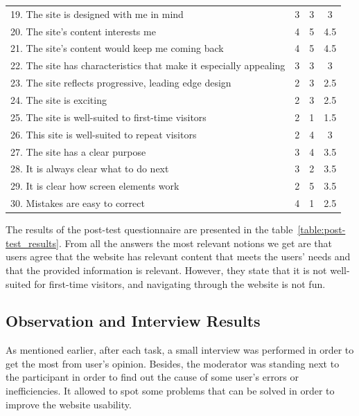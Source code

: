 \documentclass[a4paper]{article}
\begin{document}
\begin{table}[H]
\begin{center}
\begin{tabular}{p{30em}| c | c | c}
19. The site is designed with me in mind                       &  3  &  3 & 3  \\
\rowcolor{green!20}
20. The site’s content interests me                            &  4  &  5 & 4.5  \\
\rowcolor{green!20}
21. The site’s content would keep me coming back               &  4  &  5 & 4.5  \\
22. The site has characteristics that make it especially appealing  &  3  & 3 & 3   \\
23. The site reflects progressive, leading edge design         &  2  &  3 & 2.5  \\
24. The site is exciting                                       &  2  &  3 & 2.5  \\
\rowcolor{red!20}
25. The site is well-suited to first-time visitors             &  2  &  1 & 1.5  \\
26. This site is well-suited to repeat visitors                 &  2  &  4 & 3  \\
27. The site has a clear purpose                               &  3  &  4 & 3.5  \\
28. It is always clear what to do next                         &  3  &  2 & 3.5  \\
29. It is clear how screen elements work                       &  2  &  5 & 3.5  \\
30. Mistakes are easy to correct                               &  4  &  1 & 2.5  \\
\hline
\end{tabular}
\end{center}
\end{table}

The results of the post-test questionnaire are presented in the table~\ref{table:post-test_results}. From all the answers the most relevant notions we get are that users agree that the website has relevant content that meets the users' needs and that the provided information is relevant. However, they state that it is not well-suited for first-time visitors, and navigating through the website is not fun.


\subsection{Observation and Interview Results}

As mentioned earlier, after each task, a small interview was performed in order to get the most from user's opinion.
Besides, the moderator was standing next to the participant in order to find out the cause of some user's errors or inefficiencies. 
It allowed to spot some problems that can be solved in order to improve the website usability.
\end{document}
